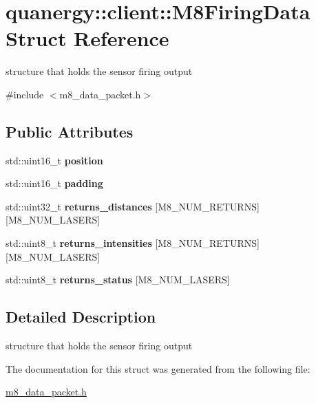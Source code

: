 \hypertarget{structquanergy_1_1client_1_1M8FiringData}{\section{quanergy\-:\-:client\-:\-:M8\-Firing\-Data Struct Reference}
\label{structquanergy_1_1client_1_1M8FiringData}
}


structure that holds the sensor firing output  




{\ttfamily \#include $<$m8\-\_\-data\-\_\-packet.\-h$>$}

\subsection*{Public Attributes}
\begin{DoxyCompactItemize}
\item 
\hypertarget{structquanergy_1_1client_1_1M8FiringData_a66d58644fd2aa753754ed3e185f2c6ca}{std\-::uint16\-\_\-t {\bfseries position}}\label{structquanergy_1_1client_1_1M8FiringData_a66d58644fd2aa753754ed3e185f2c6ca}

\item 
\hypertarget{structquanergy_1_1client_1_1M8FiringData_a94b53903975e9b9bee5f9e017cb65fba}{std\-::uint16\-\_\-t {\bfseries padding}}\label{structquanergy_1_1client_1_1M8FiringData_a94b53903975e9b9bee5f9e017cb65fba}

\item 
\hypertarget{structquanergy_1_1client_1_1M8FiringData_a435104d84db4af5f9876942ccecbab36}{std\-::uint32\-\_\-t {\bfseries returns\-\_\-distances} \mbox{[}M8\-\_\-\-N\-U\-M\-\_\-\-R\-E\-T\-U\-R\-N\-S\mbox{]}\mbox{[}M8\-\_\-\-N\-U\-M\-\_\-\-L\-A\-S\-E\-R\-S\mbox{]}}\label{structquanergy_1_1client_1_1M8FiringData_a435104d84db4af5f9876942ccecbab36}

\item 
\hypertarget{structquanergy_1_1client_1_1M8FiringData_aff116b9e02ac6d14b2e401fcfcbce0b0}{std\-::uint8\-\_\-t {\bfseries returns\-\_\-intensities} \mbox{[}M8\-\_\-\-N\-U\-M\-\_\-\-R\-E\-T\-U\-R\-N\-S\mbox{]}\mbox{[}M8\-\_\-\-N\-U\-M\-\_\-\-L\-A\-S\-E\-R\-S\mbox{]}}\label{structquanergy_1_1client_1_1M8FiringData_aff116b9e02ac6d14b2e401fcfcbce0b0}

\item 
\hypertarget{structquanergy_1_1client_1_1M8FiringData_ab1f016a109b4a8121e04c6c886ceaa07}{std\-::uint8\-\_\-t {\bfseries returns\-\_\-status} \mbox{[}M8\-\_\-\-N\-U\-M\-\_\-\-L\-A\-S\-E\-R\-S\mbox{]}}\label{structquanergy_1_1client_1_1M8FiringData_ab1f016a109b4a8121e04c6c886ceaa07}

\end{DoxyCompactItemize}


\subsection{Detailed Description}
structure that holds the sensor firing output 

The documentation for this struct was generated from the following file\-:\begin{DoxyCompactItemize}
\item 
\hyperlink{m8__data__packet_8h}{m8\-\_\-data\-\_\-packet.\-h}\end{DoxyCompactItemize}
